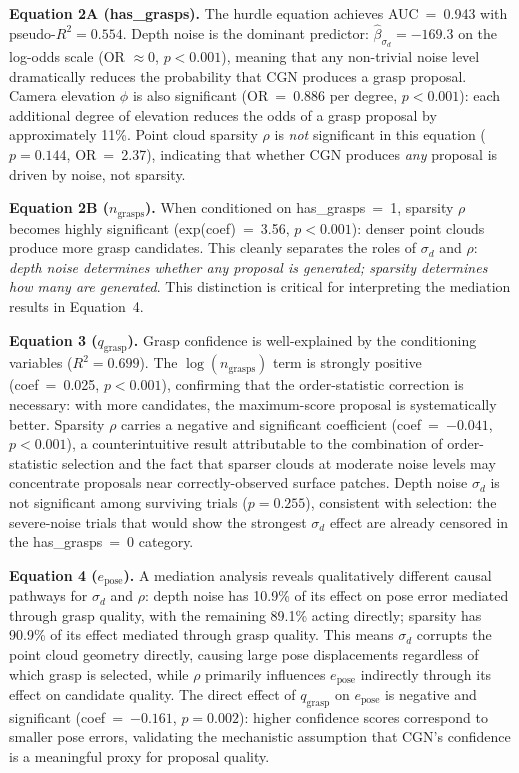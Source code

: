 \documentclass[11pt,a4paper]{report}
\begin{document}
\textbf{Equation 2A (has\_grasps).} The hurdle equation achieves AUC~=~0.943 with pseudo-$R^2 = 0.554$. Depth noise is the dominant predictor: $\hat{\beta}_{\sigma_d} = -169.3$ on the log-odds scale (OR $\approx 0$, $p < 0.001$), meaning that any non-trivial noise level dramatically reduces the probability that CGN produces a grasp proposal. Camera elevation $\phi$ is also significant (OR~=~0.886 per degree, $p < 0.001$): each additional degree of elevation reduces the odds of a grasp proposal by approximately 11\%. Point cloud sparsity $\rho$ is \emph{not} significant in this equation ($p = 0.144$, OR~=~2.37), indicating that whether CGN produces \emph{any} proposal is driven by noise, not sparsity.

\textbf{Equation 2B ($n_{\text{grasps}}$).} When conditioned on has\_grasps~=~1, sparsity $\rho$ becomes highly significant (exp(coef)~=~3.56, $p < 0.001$): denser point clouds produce more grasp candidates. This cleanly separates the roles of $\sigma_d$ and $\rho$: \emph{depth noise determines whether any proposal is generated; sparsity determines how many are generated}. This distinction is critical for interpreting the mediation results in Equation~4.

\textbf{Equation 3 ($q_{\text{grasp}}$).} Grasp confidence is well-explained by the conditioning variables ($R^2 = 0.699$). The $\log(n_{\text{grasps}})$ term is strongly positive (coef~=~0.025, $p < 0.001$), confirming that the order-statistic correction is necessary: with more candidates, the maximum-score proposal is systematically better. Sparsity $\rho$ carries a negative and significant coefficient (coef~=~$-0.041$, $p < 0.001$), a counterintuitive result attributable to the combination of order-statistic selection and the fact that sparser clouds at moderate noise levels may concentrate proposals near correctly-observed surface patches. Depth noise $\sigma_d$ is not significant among surviving trials ($p = 0.255$), consistent with selection: the severe-noise trials that would show the strongest $\sigma_d$ effect are already censored in the has\_grasps~=~0 category.

\textbf{Equation 4 ($e_{\text{pose}}$).} A mediation analysis reveals qualitatively different causal pathways for $\sigma_d$ and $\rho$: depth noise has 10.9\% of its effect on pose error mediated through grasp quality, with the remaining 89.1\% acting directly; sparsity has 90.9\% of its effect mediated through grasp quality. This means $\sigma_d$ corrupts the point cloud geometry directly, causing large pose displacements regardless of which grasp is selected, while $\rho$ primarily influences $e_{\text{pose}}$ indirectly through its effect on candidate quality. The direct effect of $q_{\text{grasp}}$ on $e_{\text{pose}}$ is negative and significant (coef~=~$-0.161$, $p = 0.002$): higher confidence scores correspond to smaller pose errors, validating the mechanistic assumption that CGN's confidence is a meaningful proxy for proposal quality.
\end{document}
